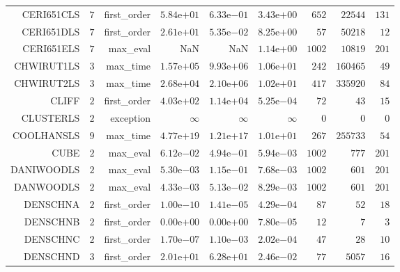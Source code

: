 \begin{longtable}{rrrrrrrrr}
CERI651CLS & \(     7\) & first\_order & \( 5.84\)e\(+01\) & \( 6.33\)e\(-01\) & \( 3.43\)e\(+00\) & \(   652\) & \( 22544\) & \(   131\) \\
CERI651DLS & \(     7\) & first\_order & \( 2.61\)e\(+01\) & \( 5.35\)e\(-02\) & \( 8.25\)e\(+00\) & \(    57\) & \( 50218\) & \(    12\) \\
CERI651ELS & \(     7\) & max\_eval &       NaN &       NaN & \( 1.14\)e\(+00\) & \(  1002\) & \( 10819\) & \(   201\) \\
CHWIRUT1LS & \(     3\) & max\_time & \( 1.57\)e\(+05\) & \( 9.93\)e\(+06\) & \( 1.06\)e\(+01\) & \(   242\) & \(160465\) & \(    49\) \\
CHWIRUT2LS & \(     3\) & max\_time & \( 2.68\)e\(+04\) & \( 2.10\)e\(+06\) & \( 1.02\)e\(+01\) & \(   417\) & \(335920\) & \(    84\) \\
CLIFF & \(     2\) & first\_order & \( 4.03\)e\(+02\) & \( 1.14\)e\(+04\) & \( 5.25\)e\(-04\) & \(    72\) & \(    43\) & \(    15\) \\
CLUSTERLS & \(     2\) & exception & \(\infty\) & \(\infty\) & \(\infty\) & \(     0\) & \(     0\) & \(     0\) \\
COOLHANSLS & \(     9\) & max\_time & \( 4.77\)e\(+19\) & \( 1.21\)e\(+17\) & \( 1.01\)e\(+01\) & \(   267\) & \(255733\) & \(    54\) \\
CUBE & \(     2\) & max\_eval & \( 6.12\)e\(-02\) & \( 4.94\)e\(-01\) & \( 5.94\)e\(-03\) & \(  1002\) & \(   777\) & \(   201\) \\
DANIWOODLS & \(     2\) & max\_eval & \( 5.30\)e\(-03\) & \( 1.15\)e\(-01\) & \( 7.68\)e\(-03\) & \(  1002\) & \(   601\) & \(   201\) \\
DANWOODLS & \(     2\) & max\_eval & \( 4.33\)e\(-03\) & \( 5.13\)e\(-02\) & \( 8.29\)e\(-03\) & \(  1002\) & \(   601\) & \(   201\) \\
DENSCHNA & \(     2\) & first\_order & \( 1.00\)e\(-10\) & \( 1.41\)e\(-05\) & \( 4.29\)e\(-04\) & \(    87\) & \(    52\) & \(    18\) \\
DENSCHNB & \(     2\) & first\_order & \( 0.00\)e\(+00\) & \( 0.00\)e\(+00\) & \( 7.80\)e\(-05\) & \(    12\) & \(     7\) & \(     3\) \\
DENSCHNC & \(     2\) & first\_order & \( 1.70\)e\(-07\) & \( 1.10\)e\(-03\) & \( 2.02\)e\(-04\) & \(    47\) & \(    28\) & \(    10\) \\
DENSCHND & \(     3\) & first\_order & \( 2.01\)e\(+01\) & \( 6.28\)e\(+01\) & \( 2.46\)e\(-02\) & \(    77\) & \(  5057\) & \(    16\) \\

\end{longtable}
